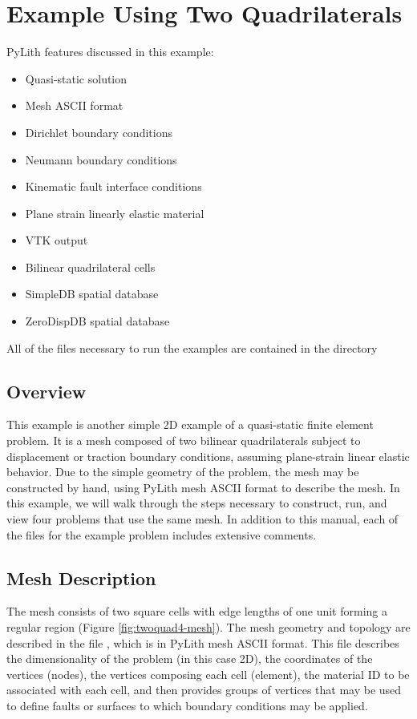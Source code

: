 \section{Example Using Two Quadrilaterals}
\label{sec:example:twoquad4}

PyLith features discussed in this example:
\begin{itemize}
\item Quasi-static solution
\item Mesh ASCII format
\item Dirichlet boundary conditions
\item Neumann boundary conditions
\item Kinematic fault interface conditions
\item Plane strain linearly elastic material
\item VTK output
\item Bilinear quadrilateral cells
\item SimpleDB spatial database
\item ZeroDispDB spatial database
\end{itemize}
All of the files necessary to run the examples are contained in the
directory 


\subsection{Overview}

This example is another simple 2D example of a quasi-static finite
element problem. It is a mesh composed of two bilinear quadrilaterals
subject to displacement or traction boundary conditions, assuming
plane-strain linear elastic behavior. Due to the simple geometry of
the problem, the mesh may be constructed by hand, using PyLith mesh
ASCII format to describe the mesh. In this example, we will walk
through the steps necessary to construct, run, and view four problems
that use the same mesh. In addition to this manual, each of the files
for the example problem includes extensive comments.


\subsection{Mesh Description}

The mesh consists of two square cells with edge lengths of one unit
forming a regular region (Figure \vref{fig:twoquad4-mesh}). The mesh
geometry and topology are described in the file ,
which is in PyLith mesh ASCII format. This file describes the dimensionality
of the problem (in this case 2D), the coordinates of the vertices
(nodes), the vertices composing each cell (element), the material
ID to be associated with each cell, and then provides groups of vertices
that may be used to define faults or surfaces to which boundary conditions
may be applied.

